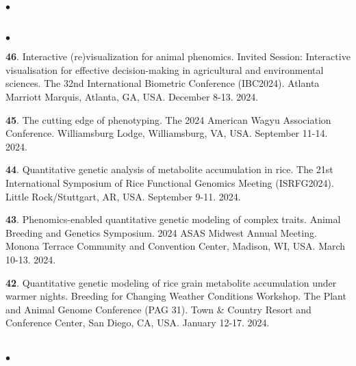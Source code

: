 \documentclass[margin,line,10pt]{res}
\newenvironment{list2}{
  \begin{list}{$\bullet$}{%
      \setlength{\itemsep}{0in}
      \setlength{\parsep}{0in} \setlength{\parskip}{0in}
      \setlength{\topsep}{0in} \setlength{\partopsep}{0in} 
      \setlength{\leftmargin}{0.2in}}}{\end{list}}
\begin{document}
\begin{resume}
\begin{list2}
\end{list2}



\section{}
\begin{list2}

  \item [{\bf 46}.] Interactive (re)visualization for animal phenomics. Invited Session: Interactive visualisation for effective decision-making in agricultural and environmental sciences. The 32nd International Biometric Conference (IBC2024). Atlanta Marriott Marquis, Atlanta, GA, USA. December 8-13. 2024. 

  \vspace{0.5cm}

  \item [{\bf 45}.] The cutting edge of phenotyping.  The 2024 American Wagyu Association Conference. Williamsburg Lodge, Williamsburg, VA, USA. September 11-14. 2024.

  \vspace{0.5cm}


   \item [{\bf 44}.] Quantitative genetic analysis of metabolite accumulation in rice. The 21st International Symposium of Rice Functional Genomics Meeting (ISRFG2024). Little Rock/Stuttgart, AR, USA. September 9-11. 2024.

  \vspace{0.5cm}

  \item [{\bf 43}.] Phenomics-enabled quantitative genetic modeling of complex traits. Animal Breeding and Genetics Symposium. 2024 ASAS Midwest Annual Meeting. Monona Terrace Community and Convention Center, Madison, WI, USA. March 10-13. 2024. 

  \vspace{0.5cm}

  \item [{\bf 42}.] Quantitative genetic modeling of rice grain metabolite accumulation under warmer nights. Breeding for Changing Weather Conditions Workshop. The Plant and Animal Genome Conference (PAG 31). Town \& Country Resort and Conference Center, San Diego, CA, USA. January 12-17. 2024. 

\end{list2}


\section{}
\begin{list2}


\end{list2}
\end{resume}
\end{document}
